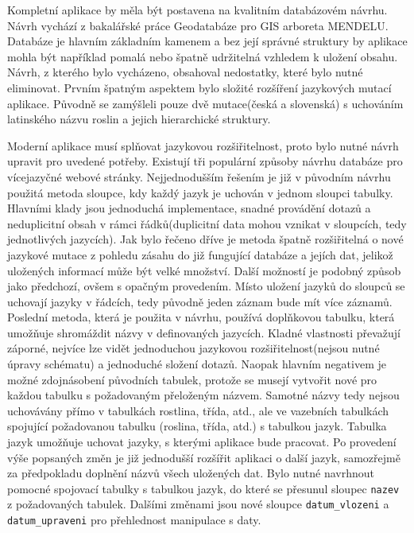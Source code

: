 \documentclass[12pt]{article}%
\begin{document}
{{\newpage
{}


Kompletní aplikace by měla být postavena na kvalitním databázovém návrhu. Návrh vychází 
z bakalářské práce Geodatabáze pro GIS arboreta MENDELU. Databáze je hlavním základním 
kamenem a bez její správné struktury by aplikace mohla být například pomalá nebo špatně udržitelná 
vzhledem k uložení obsahu. Návrh, z kterého bylo vycházeno, obsahoval nedostatky, které bylo 
nutné eliminovat. Prvním špatným aspektem bylo složité rozšíření jazykových mutací aplikace. 
Původně se zamýšleli pouze dvě mutace(česká a slovenská) s uchováním latinského názvu roslin 
a jejich hierarchické struktury. 

Moderní aplikace musí splňovat jazykovou rozšiřitelnost, proto 
bylo nutné návrh upravit pro uvedené potřeby. Existují tři populární způsoby návrhu databáze 
pro vícejazyčné webové stránky. Nejjednodušším řešením je již v původním návrhu použitá metoda sloupce, 
kdy každý jazyk je uchován v jednom sloupci tabulky. Hlavními klady jsou jednoduchá implementace, 
snadné provádění dotazů a neduplicitní obsah v rámci řádků(duplicitní data mohou vznikat 
v sloupcích, tedy jednotlivých jazycích). Jak bylo řečeno dříve je metoda špatně rozšiřitelná 
o nové jazykové mutace z pohledu zásahu do již fungující databáze a jejích dat, jelikož uložených
informací může být velké množství. Další možností je podobný způsob jako předchozí, ovšem s opačným 
provedením. Místo uložení jazyků do sloupců se uchovají jazyky v řádcích, tedy původně jeden záznam 
bude mít více záznamů. Poslední metoda, která je použita v návrhu, používá doplňkovou tabulku, která 
umožňuje shromáždit názvy v definovaných jazycích. Kladné vlastnosti převažují záporné, nejvíce lze
vidět jednoduchou jazykovou rozšiřitelnost(nejsou nutné úpravy schématu) a jednoduché složení dotazů.
Naopak hlavním negativem je možné zdojnásobení původních tabulek, protože se musejí vytvořit nové 
pro každou tabulku s požadovaným přeloženým názvem. Samotné názvy tedy nejsou uchovávány přímo 
v tabulkách rostlina, třída, atd., ale ve vazebních tabulkách spojující požadovanou tabulku
(roslina, třída, atd.) s tabulkou jazyk. Tabulka jazyk umožňuje uchovat jazyky, s kterými aplikace 
bude pracovat. Po provedení výše popsaných změn je již jednodušší rozšířit aplikaci o další jazyk, 
samozřejmě za předpokladu doplnění názvů všech uložených dat. Bylo nutné navrhnout pomocné spojovací 
tabulky s tabulkou jazyk, do které se přesunul sloupec \texttt{nazev} z požadovaných tabulek. 
Dalšími změnami jsou nové sloupce \texttt{datum\_vlozeni} a \texttt{datum\_upraveni} pro přehlednost 
manipulace s daty.

}}
\end{document}
